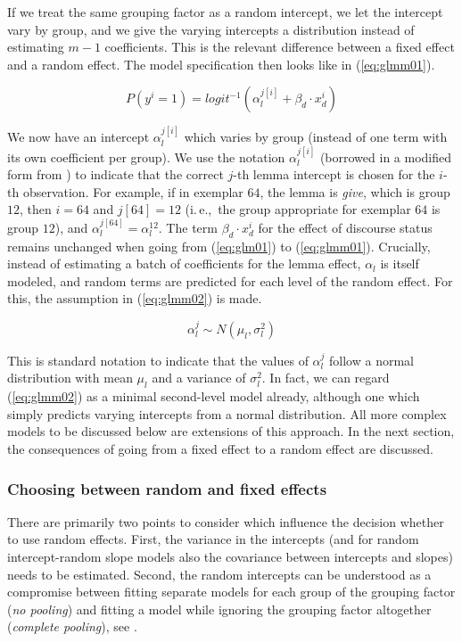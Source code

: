 \documentclass[a4paper,12pt]{article}
\newcommand{\ie}{i.\,e.,\ }
\begin{document}
If we treat the same grouping factor as a random intercept, we let the intercept vary by group, and we give the varying intercepts a distribution instead of estimating $m-1$ coefficients.
This is the relevant difference between a fixed effect and a random effect.
The model specification then looks like in (\ref{eq:glmm01}).

\begin{equation}
  P(y^i=1)=logit^{-1}(\alpha_{l}^{j[i]}+\beta_d\cdot x_d^i)
  \label{eq:glmm01}
\end{equation}

We now have an intercept $\alpha_l^{j[i]}$ which varies by group (instead of one term with its own coefficient per group).
We use the notation $\alpha_l^{j[i]}$ (borrowed in a modified form from \citealt{GelmanHill2006}) to indicate that the correct $j$-th lemma intercept is chosen for the $i$-th observation.
For example, if in exemplar $64$, the lemma is \textit{give}, which is group $12$, then $i=64$ and $j[64]=12$ (\ie the group appropriate for exemplar $64$ is group $12$), and $\alpha_l^{j[64]}=\alpha_l^{12}$.
The term $\beta_d\cdot x_d^i$ for the effect of discourse status remains unchanged when going from (\ref{eq:glm01}) to (\ref{eq:glmm01}).
Crucially, instead of estimating a batch of coefficients for the lemma effect, $\alpha_l$ is itself modeled, and random terms are predicted for each level of the random effect.
For this, the assumption in (\ref{eq:glmm02}) is made.

\begin{equation}
  \alpha_l^j\sim N(\mu_l,\sigma_l^2)
  \label{eq:glmm02}
\end{equation}

This is standard notation to indicate that the values of $\alpha_l^j$ follow a normal distribution with mean $\mu_l$ and a variance of $\sigma_l^2$.
In fact, we can regard (\ref{eq:glmm02}) as a minimal second-level model already, although one which simply predicts varying intercepts from a normal distribution.
All more complex models to be discussed below are extensions of this approach.
In the next section, the consequences of going from a fixed effect to a random effect are discussed.

\subsubsection{Choosing between random and fixed effects}
\label{sec:choosingbetweenrandomandfixedeffects}

There are primarily two points to consider which influence the decision whether to use random effects.
First, the variance in the intercepts (and for random intercept-random slope models also the covariance between intercepts and slopes) needs to be estimated.
Second, the random intercepts can be understood as a compromise between fitting separate models for each group of the grouping factor (\textit{no pooling}) and fitting a model while ignoring the grouping factor altogether (\textit{complete pooling}), see \citet[Ch.~12]{GelmanHill2006}.
\end{document}

